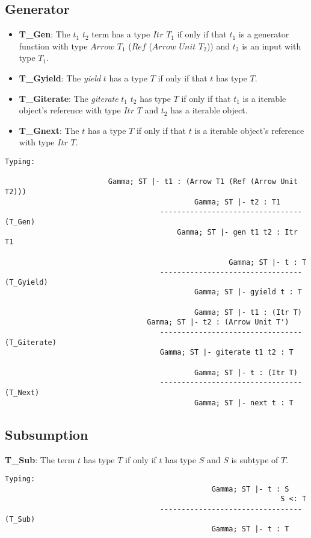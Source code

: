 \subsection{Generator}
\begin{itemize}
	\item \textbf{T_Gen}: The \gen $t_1$ $t_2$ term has a type $Itr$ $T_1$ if only if that $t_1$ is a generator function with type $Arrow$ $T_1$ ($Ref$ ($Arrow$ $Unit$ $T_2$)) and $t_2$ is an input with type $T_1$.
	\item \textbf{T_Gyield}: The \textit{yield} $t$ has a type $T$ if only if that $t$ has type $T$.
	\item \textbf{T_Giterate}: The \textit{giterate} $t_1$ $t_2$ has type $T$ if only if that $t_1$ is a iterable object's reference with type $Itr$ $T$ and $t_2$ has a iterable object.
	\item \textbf{T_Gnext}: The \nt $t$ has a type $T$ if only if that $t$ is a iterable object's reference with type $Itr$ $T$.
\end{itemize}
\begin{lstlisting}
Typing:

						Gamma; ST |- t1 : (Arrow T1 (Ref (Arrow Unit T2)))
										    Gamma; ST |- t2 : T1
									--------------------------------- (T_Gen)
										Gamma; ST |- gen t1 t2 : Itr T1

													Gamma; ST |- t : T
									--------------------------------- (T_Gyield)
											Gamma; ST |- gyield t : T

											Gamma; ST |- t1 : (Itr T)
								 Gamma; ST |- t2 : (Arrow Unit T')
									--------------------------------- (T_Giterate)
									Gamma; ST |- giterate t1 t2 : T

											Gamma; ST |- t : (Itr T)
									--------------------------------- (T_Next)
											Gamma; ST |- next t : T
\end{lstlisting}

\subsection{Subsumption}
\textbf{T_Sub}: The term $t$ has type $T$ if only if $t$ has type $S$ and $S$ is subtype of $T$.
\begin{lstlisting}
Typing:
												Gamma; ST |- t : S
																S <: T
									--------------------------------- (T_Sub)
												Gamma; ST |- t : T
\end{lstlisting}